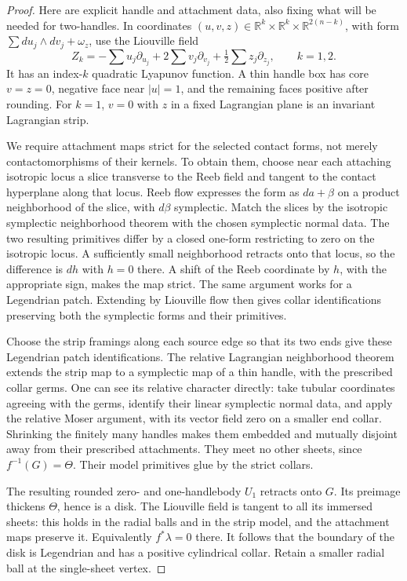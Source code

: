 \documentclass[11pt]{article}
\numberwithin{equation}{section}
\theoremstyle{definition}
\theoremstyle{remark}
\begin{document}
\begin{proof}
Here are explicit handle and attachment data, also fixing what
will be needed for two-handles.  In coordinates
$(u,v,z)\in\mathbb R^k\times\mathbb R^k\times\mathbb R^{2(n-k)}$, with form
$\sum du_j\wedge dv_j+\omega_z$, use the Liouville field
\begin{equation}\label{top:eq:handle-model}
       Z_k=-\sum u_j\partial_{u_j}
                    +2\sum v_j\partial_{v_j}
                    +\tfrac12\sum z_j\partial_{z_j},\qquad k=1,2.
\end{equation}
It has an index-$k$ quadratic Lyapunov function.  A thin handle box
has core $v=z=0$, negative face near $|u|=1$, and the remaining
faces positive after rounding.  For $k=1$, $v=0$ with $z$ in a
fixed Lagrangian plane is an invariant Lagrangian strip.

We require attachment maps strict for the selected contact forms,
not merely contactomorphisms of their kernels.  To obtain them,
choose near each attaching isotropic locus a slice transverse to
the Reeb field and tangent to the contact hyperplane along that
locus.  Reeb flow expresses the form as $da+\beta$ on a product
neighborhood of the slice, with $d\beta$ symplectic.  Match the
slices by the isotropic symplectic neighborhood theorem with the
chosen symplectic normal data.  The two resulting primitives differ
by a closed one-form restricting to zero on the isotropic locus.
A sufficiently small neighborhood retracts onto that locus, so
the difference is $dh$ with $h=0$ there.  A shift of the Reeb
coordinate by $h$, with the appropriate sign, makes the map
strict.  The same argument works for a Legendrian patch.
Extending by Liouville flow then gives collar identifications
preserving both the symplectic forms and their primitives.

Choose the strip framings along each source edge so that its two
ends give these Legendrian patch identifications.  The relative
Lagrangian neighborhood theorem extends the strip map to a
symplectic map of a thin handle, with the prescribed collar germs.
One can see its relative character directly: take tubular
coordinates agreeing with the germs, identify their linear
symplectic normal data, and apply the relative Moser argument,
with its vector field zero on a smaller end collar.  Shrinking
the finitely many handles makes them embedded and mutually
disjoint away from their prescribed attachments.  They meet no
other sheets, since $f^{-1}(G)=\Theta$.  Their model primitives
glue by the strict collars.

The resulting rounded zero- and one-handlebody $U_1$ retracts onto
$G$.  Its preimage thickens $\Theta$, hence is a disk.  The
Liouville field is tangent to all its immersed sheets: this holds
in the radial balls and in the strip model, and the attachment
maps preserve it.  Equivalently $f^*\lambda=0$ there.  It follows
that the boundary of the disk is Legendrian and has a positive
cylindrical collar.  Retain a smaller radial ball at the
single-sheet vertex.


\end{proof}
\end{document}
